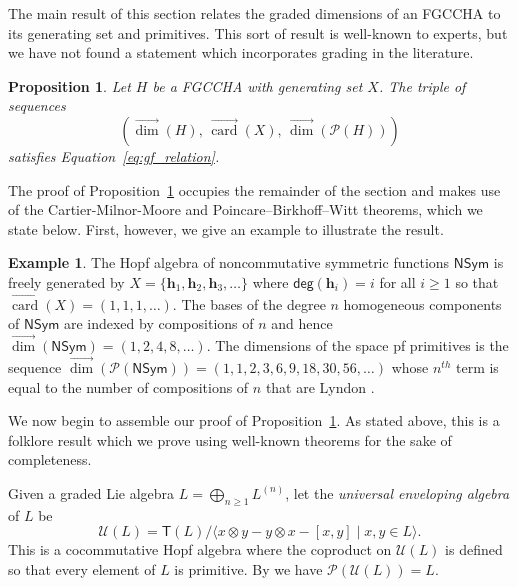 \documentclass[11pt]{amsart}
\newtheorem{proposition}[theorem]{Proposition}
\theoremstyle{definition}
\newtheorem{example}[theorem]{Example}
\numberwithin{equation}{section}
\newcommand{\FGCCHA}{\textsf{FGCCHA}\xspace}
\newcommand{\vecdim}{\overrightarrow{\dim}}
\newcommand{\veccard}{\overrightarrow{\operatorname{card}}}
\begin{document}
The main result of this section relates the graded dimensions of an \FGCCHA to its generating set and primitives.  
This sort of result is well-known to experts, but we have not found a statement which incorporates grading in the literature.  

\begin{proposition}
\label{prop:SequencesAsHopfStructures}
Let $H$ be a \FGCCHA with generating set $X$.  The triple of sequences
\[
\left(\vecdim(H), \,
\veccard(X),\,
\vecdim\left(\mathcal{P}(H)\right) \right)
\]
satisfies Equation~\eqref{eq:gf_relation}.
\end{proposition}

The proof of Proposition~\ref{prop:SequencesAsHopfStructures} occupies the remainder of the section and makes use of the Cartier-Milnor-Moore and Poincare--Birkhoff--Witt theorems, which we state below.  First, however,  we give an example to illustrate the result.  

\begin{example}
\label{ex:NSym}
The Hopf algebra of noncommutative symmetric functions $\mathsf{NSym}$ \cite{GKLLRT}
is freely generated by $X = \{ \mathbf{h}_1, \mathbf{h}_2, \mathbf{h}_3, \ldots \}$ where $\mathsf{deg}(\mathbf{h}_{i}) = i$ for all $i \ge 1$ so that $\veccard(X) = (1, 1, 1, \ldots)$.  
The bases of the degree $n$ homogeneous components of $\mathsf{NSym}$ are indexed by compositions
of $n$ and hence $\vecdim(\mathsf{NSym}) = (1,2,4,8,\ldots)$.
The dimensions of the space pf primitives is the sequence 
$\vecdim(\mathcal{P}(\mathsf{NSym})) = (1, 1, 2, 3, 6, 9, 18, 30, 56, \ldots)$
whose $n^{th}$ term is equal to the number
of compositions of $n$ that are Lyndon \cite{H07}.
\end{example}

We now begin to assemble our proof of Proposition~\ref{prop:SequencesAsHopfStructures}.  
As stated above, this is a folklore result which we prove using well-known theorems for the sake of completeness.  

Given a graded Lie algebra $L = \bigoplus_{n \ge 1} L^{(n)}$, let the \emph{universal enveloping algebra} of $L$ be
\[
\mathcal{U}(L) = \mathsf{T}(L) \big/ \big\langle x\otimes y - y \otimes x - [x, y] \;|\; \text{$x, y \in L$} \big\rangle.
\]
This is a cocommutative Hopf algebra where the coproduct on $\mathcal{U}(L)$ is defined so that every element of $L$ is primitive.  By \cite[Theorem 1.4]{Reutenauer-FreeLieAlgebras} we have $\mathcal{P}(\mathcal{U}(L))=L$.  
\end{document}
